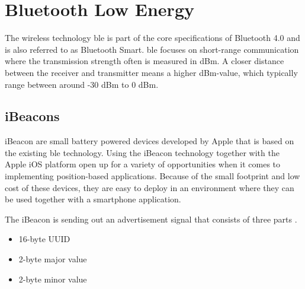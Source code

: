 \section{Bluetooth Low Energy}\label{sec:theoryBle}
The wireless technology \acrfull{ble} is part of the core specifications of Bluetooth 4.0 and is also referred to as Bluetooth Smart.
\acrshort{ble} focuses on short-range communication where the transmission strength often is measured in dBm.
A closer distance between the receiver and transmitter means a higher dBm-value, which typically range between around -30 dBm to 0 dBm.
\cite{DevelopmentMobileIndoor2017} 

\bigskip


\bigskip



\subsection{iBeacons}\label{sec:theoryBleiBeacons}
iBeacon are small battery powered devices developed by Apple that is based on the existing \acrshort{ble} technology.
Using the iBeacon technology together with the Apple iOS platform open up for a variety of opportunities when it comes to implementing position-based applications.
Because of the small footprint and low cost of these devices, they are easy to deploy in an environment where they can be used together with a smartphone application.
\cite{BluetoothLowEnergy2018} 

\bigskip

The iBeacon is sending out an advertisement signal that consists of three parts \cite{GettingStartedIBeacon2014}.
\begin{itemize}
\item 16-byte UUID
\item 2-byte major value
\item 2-byte minor value
\end{itemize}

